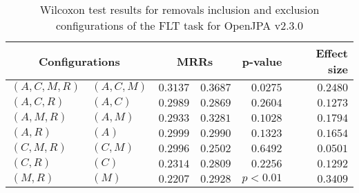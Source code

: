 
\begin{table}
\begin{spacing}{1.2}
\centering
\caption{Wilcoxon test results for removals inclusion and exclusion configurations of the FLT task for OpenJPA v2.3.0}
\label{table:versus-wilcox-openjpa-flt-removals}
\begin{tabular}{ll|rr|rr}
\toprule
      \multicolumn{2}{c|}{Configurations} &          \multicolumn{2}{c|}{MRRs} &       p-value & Effect size \\
\midrule
 $(A,C,M,R)$ &  $(A,C,M)$ & $0.3137$ & $0.3687$ & $0.0275$ &    $0.2480$ \\
   $(A,C,R)$ &    $(A,C)$ & $0.2989$ & $0.2869$ & $0.2604$ &    $0.1273$ \\
   $(A,M,R)$ &    $(A,M)$ & $0.2933$ & $0.3281$ & $0.1028$ &    $0.1794$ \\
     $(A,R)$ &      $(A)$ & $0.2999$ & $0.2990$ & $0.1323$ &    $0.1654$ \\
   $(C,M,R)$ &    $(C,M)$ & $0.2996$ & $0.2502$ & $0.6492$ &    $0.0501$ \\
     $(C,R)$ &      $(C)$ & $0.2314$ & $0.2809$ & $0.2256$ &    $0.1292$ \\
     $(M,R)$ &      $(M)$ & $0.2207$ & $0.2928$ & $p<0.01$ &    $0.3409$ \\
\bottomrule
\end{tabular}

\end{spacing}
\end{table}

